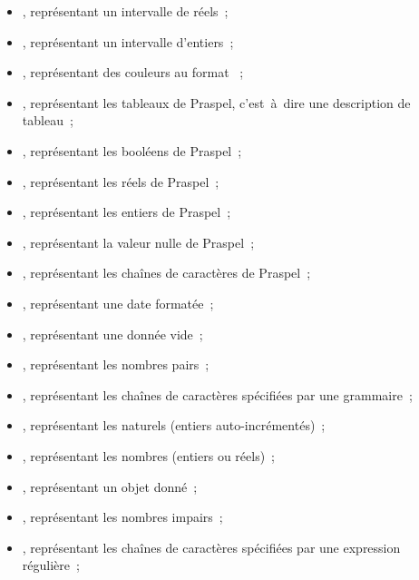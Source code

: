 \begin{enumerate}[couche 1]
\begin{itemize}
    \item {}, représentant un intervalle de réels~;

    \item {}, représentant un intervalle d'entiers~;

    \item {}, représentant des couleurs au format ~;

    \item {}, représentant les tableaux de Praspel, c'est~à~dire une
    description de tableau~;

    \item {}, représentant les booléens de Praspel~;

    \item {}, représentant les réels de Praspel~;

    \item {}, représentant les entiers de Praspel~;

    \item {}, représentant la valeur nulle de Praspel~;

    \item {}, représentant les chaînes de caractères de Praspel~;

    \item {}, représentant une date formatée~;

    \item {}, représentant une donnée vide~;

    \item {}, représentant les nombres pairs~;

    \item {}, représentant les chaînes de caractères spécifiées par une
    grammaire~;

    \item {}, représentant les naturels (entiers auto-incrémentés)~;

    \item {}, représentant les nombres (entiers ou réels)~;

    \item {}, représentant un objet donné~;

    \item {}, représentant les nombres impairs~;

    \item {}, représentant les chaînes de caractères spécifiées par une
    expression régulière~;


\end{itemize}
\end{enumerate}
